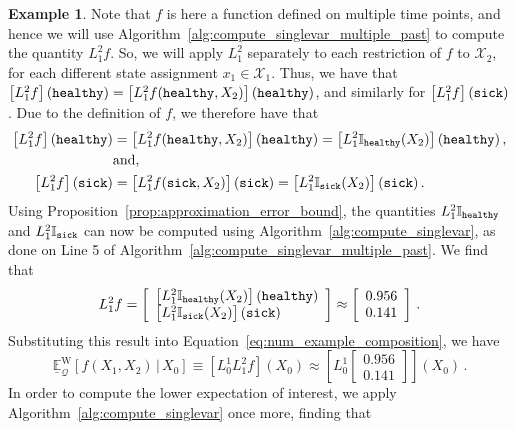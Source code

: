 \documentclass[10pt,a4paper]{paper}
\theoremstyle{definition}
\newtheorem{exmp}{Example}%
\newcommand{\states}{\mathcal{X}}
\newcommand{\ind}[1]{\mathbb{I}_{#1}}
\newcommand{\rateset}{\mathcal{Q}}
\begin{document}
\begin{exmp}
Note that $f$ is here a function defined on multiple time points, and hence we will use Algorithm~\ref{alg:compute_singlevar_multiple_past} to compute the quantity $L_1^2f$. So, we will apply $L_1^2$ separately to each restriction of $f$ to $\states_2$, for each different state assignment $x_1\in\states_1$. Thus, we have that $\left[L_1^2f\right](\text{{\tt healthy}}) = \left[L_1^2f(\text{{\tt healthy}}, X_2)\right](\text{{\tt healthy}})$, and similarly for $\left[L_1^2f\right](\text{{\tt sick}})$. Due to the definition of $f$, we therefore have that
\begin{align*}
\left[L_1^2f\right](\text{{\tt healthy}}) &= \left[L_1^2f(\text{{\tt healthy}}, X_2)\right](\text{{\tt healthy}}) = \left[L_1^2\ind{\text{{\tt healthy}}}(X_2)\right](\text{{\tt healthy}})\,,\\
 &\text{and,} \\
\left[L_1^2f\right](\text{{\tt sick}}) &= \left[L_1^2f(\text{{\tt sick}}, X_2)\right](\text{{\tt sick}}) = \left[L_1^2\ind{\text{{\tt sick}}}(X_2)\right](\text{{\tt sick}})\,.
\end{align*}
Using Proposition~\ref{prop:approximation_error_bound}, the quantities $L_1^2\ind{\text{{\tt healthy}}}$ and $L_1^2\ind{\text{{\tt sick}}}$ can now be computed using Algorithm~\ref{alg:compute_singlevar}, as done on Line 5 of Algorithm~\ref{alg:compute_singlevar_multiple_past}. We find that
\begin{equation*}
L_1^2 f = \left[\begin{array}{l}
\left[L_1^2\ind{\text{{\tt healthy}}}(X_2)\right](\text{{\tt healthy}}) \\
\left[L_1^2\ind{\text{{\tt sick}}}(X_2)\right](\text{{\tt sick}})
\end{array}\right] 
\approx \left[\begin{array}{c}
0.956 \\
0.141
\end{array}\right]\,.
\end{equation*}
Substituting this result into Equation~\eqref{eq:num_example_composition}, we have
\begin{equation*}
\underline{\mathbb{E}}_{\rateset}^\mathrm{W}[f(X_1,X_2)\,\vert\,X_0] \equiv \left[L_0^1L_1^2f\right](X_0) \approx \left[L_0^1 \left[\begin{array}{c}
0.956 \\
0.141
\end{array}\right]\right](X_0)\,.
\end{equation*}
In order to compute the lower expectation of interest, we apply Algorithm~\ref{alg:compute_singlevar} once more, finding that

\end{exmp}
\end{document}

